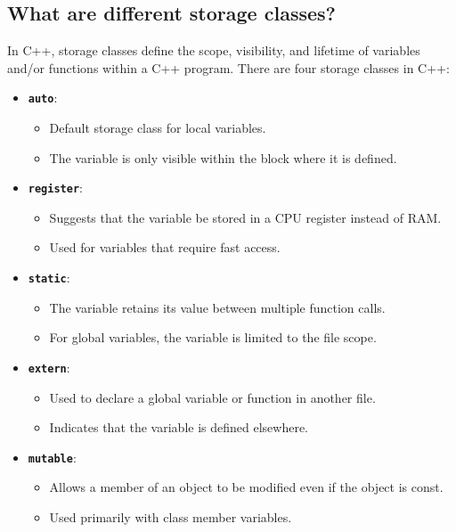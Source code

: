 \subsection{What are different storage classes?}
In C++, storage classes define the scope, visibility, and lifetime of variables and/or functions within a C++ program. There are four storage classes in C++:

\begin{itemize}
    \item \textbf{\texttt{auto}}:
    \begin{itemize}
        \item Default storage class for local variables.
        \item The variable is only visible within the block where it is defined.
    \end{itemize}
    \item \textbf{\texttt{register}}:
    \begin{itemize}
        \item Suggests that the variable be stored in a CPU register instead of RAM.
        \item Used for variables that require fast access.
    \end{itemize}
    \item \textbf{\texttt{static}}:
    \begin{itemize}
        \item The variable retains its value between multiple function calls.
        \item For global variables, the variable is limited to the file scope.
    \end{itemize}
    \item \textbf{\texttt{extern}}:
    \begin{itemize}
        \item Used to declare a global variable or function in another file.
        \item Indicates that the variable is defined elsewhere.
    \end{itemize}
    \item \textbf{\texttt{mutable}}:
    \begin{itemize}
        \item Allows a member of an object to be modified even if the object is const.
        \item Used primarily with class member variables.
    \end{itemize}
\end{itemize}

